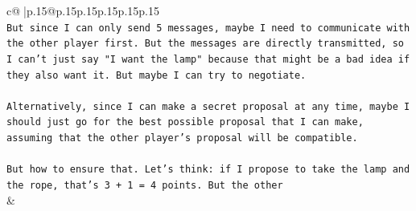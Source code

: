\documentclass{article}
\begin{document}
{\begin{supertabular}{c@{$\;$}|p{.15\linewidth}@{}p{.15\linewidth}p{.15\linewidth}p{.15\linewidth}p{.15\linewidth}p{.15\linewidth}}
{{{\\ 
\texttt{But since I can only send 5 messages, maybe I need to communicate with the other player first. But the messages are directly transmitted, so I can't just say "I want the lamp" because that might be a bad idea if they also want it. But maybe I can try to negotiate.} \\
\\ 
\texttt{Alternatively, since I can make a secret proposal at any time, maybe I should just go for the best possible proposal that I can make, assuming that the other player's proposal will be compatible.} \\
\\ 
\texttt{But how to ensure that. Let's think: if I propose to take the lamp and the rope, that's 3 + 1 = 4 points. But the other} \\
            }
        }
    }
    & \\ \\


\end{supertabular}}
\end{document}
